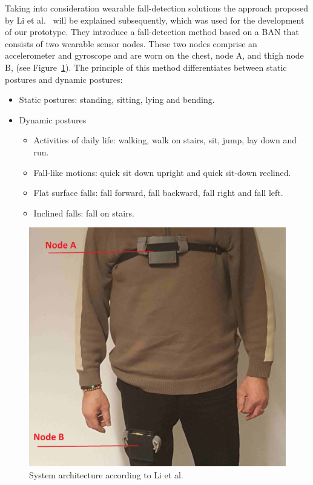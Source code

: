 \documentclass[conference]{IEEEtran}
\theoremstyle{definition}
\begin{document}
Taking into consideration wearable fall-detection solutions the approach proposed by Li et al.~\cite{Li2009} will be explained subsequently, 
which was used for the development of our prototype. They introduce a fall-detection method based on a BAN that consists 
of two wearable sensor nodes. These two nodes comprise an accelerometer and gyroscope and are worn on the chest, node A, and thigh 
node B, (see Figure~\ref{fig:simulation}). The principle of this method differentiates between static postures and dynamic postures: 

\begin{itemize}
 \item Static postures: standing, sitting, lying and bending.
 \item Dynamic postures
 \begin{itemize}
  \item Activities of daily life: walking, walk on stairs, sit, jump, lay down and run.
  \item Fall-like motions: quick sit down upright and quick sit-down reclined.
  \item Flat surface falls: fall forward, fall backward, fall right and fall left.
  \item Inclined falls: fall on stairs.
 \end{itemize}
\end{itemize}

\begin{figure}[!h]
  \centering
  \includegraphics[scale=0.2]{img/BasePrototype.png}
  \caption[System architecture]{System architecture according to Li et al.~\cite{Li2009}}
  \label{fig:simulation}
\end{figure}
\end{document}
